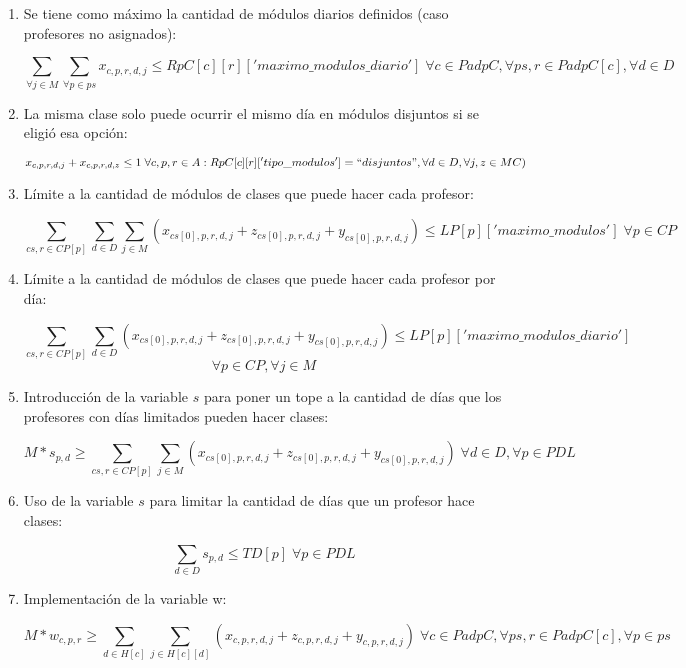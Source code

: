 \documentclass[letterpaper]{article}
\begin{document}
\begin{enumerate}
    \item Se tiene como máximo la cantidad de módulos diarios definidos (caso profesores no asignados):

    $$\sum_{\forall j \in M} \sum_{\forall p \in ps} x_{c,p,r,d,j} \leq RpC[c][r]['maximo\_modulos\_diario'] \; \forall c \in PadpC, \forall ps,r \in PadpC[c], \forall d \in D$$

    \item La misma clase solo puede ocurrir el mismo día en módulos disjuntos si se eligió esa opción:

    $$x_{c,p,r,d,j} + x_{c,p,r,d,z} \leq 1 \; \forall c,p,r \in A : RpC[c][r]['tipo\_modulos'] = ``disjuntos", \forall d \in D, \forall j,z \in MC)$$

    \item Límite a la cantidad de módulos de clases que puede hacer cada profesor:

    $$\sum_{cs,r \in CP[p]} \sum_{d \in D} \sum_{j \in M} (x_{cs[0],p,r,d,j} + z_{cs[0],p,r,d,j} + y_{cs[0],p,r,d,j}) \leq LP[p]['maximo\_modulos'] \; \forall p \in CP$$

    \item Límite a la cantidad de módulos de clases que puede hacer cada profesor por día:

    $$\sum_{cs,r \in CP[p]} \sum_{d \in D}(x_{cs[0],p,r,d,j} + z_{cs[0],p,r,d,j} + y_{cs[0],p,r,d,j}) \leq LP[p]['maximo\_modulos\_diario']$$
    $$\forall p \in CP, \forall j \in M$$

    \item Introducción de la variable $s$ para poner un tope a la cantidad de días que los profesores con días limitados pueden hacer clases:

    $$M * s_{p,d} \geq \sum_{cs,r \in CP[p]} \sum_{j \in M} (x_{cs[0],p,r,d,j} + z_{cs[0],p,r,d,j} + y_{cs[0],p,r,d,j}) \; \forall d \in D, \forall p \in PDL$$

    \item Uso de la variable $s$ para limitar la cantidad de días que un profesor hace clases:

    $$\sum_{d \in D} s_{p,d} \leq TD[p] \; \forall p \in PDL$$

    \item Implementación de la variable w:

    $$M * w_{c,p,r} \geq \sum_{d \in H[c]} \sum_{j \in H[c][d]} (x_{c,p,r,d,j} + z_{c,p,r,d,j} + y_{c,p,r,d,j})\; \forall c \in PadpC, \forall ps,r \in PadpC[c], \forall p \in ps$$


\end{enumerate}
\end{document}
